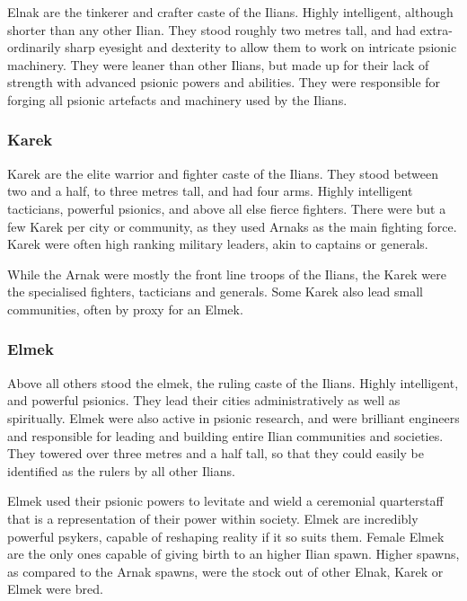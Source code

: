 Elnak are the tinkerer and crafter caste of the Ilians. Highly intelligent,
although shorter than any other Ilian. They stood roughly two metres tall, and
had extra-ordinarily sharp eyesight and dexterity to allow them to work on
intricate psionic machinery. They were leaner than other Ilians, but made up
for their lack of strength with advanced psionic powers and abilities. They
were responsible for forging all psionic artefacts and machinery used by the
Ilians.

\subsubsection{Karek}
\label{sec:Karek}

Karek are the elite warrior and fighter caste of the Ilians. They stood between
two and a half, to three metres tall, and had four arms. Highly intelligent
tacticians, powerful psionics, and above all else fierce fighters. There were
but a few Karek per city or community, as they used Arnaks as the main fighting
force. Karek were often high ranking military leaders, akin to captains or
generals.

While the Arnak were mostly the front line troops of the Ilians, the Karek were
the specialised fighters, tacticians and generals. Some Karek also lead small
communities, often by proxy for an Elmek.

\subsubsection{Elmek}
\label{sec:Elmek}

Above all others stood the elmek, the ruling caste of the Ilians. Highly
intelligent, and powerful psionics. They lead their cities administratively as
well as spiritually. Elmek were also active in psionic research, and were
brilliant engineers and responsible for leading and building entire Ilian
communities and societies. They towered over three metres and a half tall,
so that they could easily be identified as the rulers by all other Ilians.

Elmek used their psionic powers to levitate and wield a ceremonial
quarterstaff that is a representation of their power within society. Elmek are
incredibly powerful psykers, capable of reshaping reality if it so suits
them. Female Elmek are the only ones capable of giving birth to an higher
Ilian spawn. Higher spawns, as compared to the Arnak spawns, were the stock
out of other Elnak, Karek or Elmek were bred.
